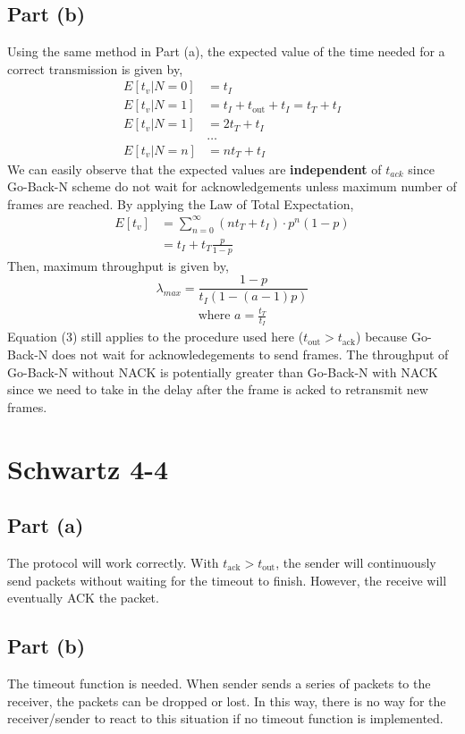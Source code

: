 \documentclass{article}
\begin{document}
	\subsection*{Part (b)}
		Using the same method in Part (a), the expected value of the time needed
		for a correct transmission is given by,
		\begin{align*}
			E[t_v | N = 0] &= t_I \\
			E[t_v | N = 1] &= t_I + t_{\text{out}} + t_I = t_T + t_I \\
			E[t_v | N = 1] &= 2t_T + t_I \\
			&\ldots \\
			E[t_v | N = n] &= nt_T + t_I
		\end{align*}
		We can easily observe that the expected values are \textbf{independent} of
		$t_{ack}$ since Go-Back-N scheme do not wait for acknowledgements unless
		maximum number of frames are reached. By applying the Law of Total
		Expectation,
		\begin{align*}
			E[t_v] &= \sum_{n=0}^{\infty} (nt_T + t_I) \cdot p^{n}(1-p) \\
			&= t_I + t_T \frac{p}{1-p}
		\end{align*}
		Then, maximum throughput is given by,
		\begin{equation}
			\lambda_{max} = \frac{1-p}{t_I(1 - (a-1)p)}
		\end{equation}
		\begin{align*}
			\text{where } a = \frac{t_T}{t_I} 
		\end{align*}
		Equation (3) still applies to the procedure used here
		($t_{\text{out}} > t_{\text{ack}}$) because Go-Back-N does not wait for
		acknowledegements to send frames. The throughput of Go-Back-N without NACK
		is potentially greater than Go-Back-N with NACK since we need to take in
		the delay after the frame is acked to retransmit new frames.
\section*{Schwartz 4-4}
	\subsection*{Part (a)}
		The protocol will work correctly. With $t_{\text{ack}} > t_{\text{out}}$,
		the sender will continuously send packets without waiting for the timeout
		to finish. However, the receive will eventually ACK the packet.
	\subsection*{Part (b)}
		The timeout function is needed. When sender sends a series of packets to
		the receiver, the packets can be dropped or lost. In this way, there is no
		way for the receiver/sender to react to this situation if no timeout
		function is implemented.
\end{document}
